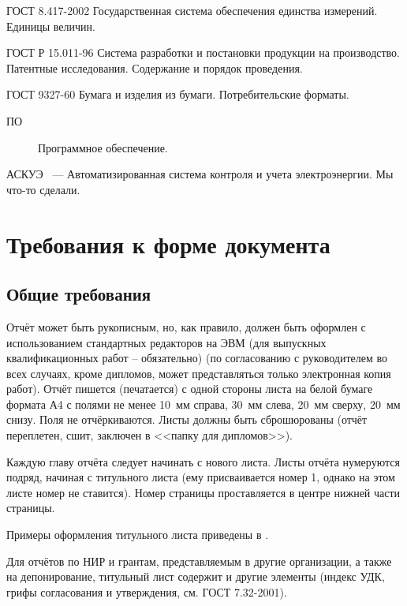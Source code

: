 \documentclass[utf8,12pt, coursreport]{G7-32}
\begin{document}
ГОСТ 8.417-2002 Государственная система обеспечения единства измерений. Единицы величин.

ГОСТ Р 15.011-96 Система разработки и постановки продукции на производство. Патентные исследования. Содержание и порядок проведения.

ГОСТ 9327-60 Бумага и изделия из бумаги. Потребительские форматы.


\Abbreviations

\begin{description}
\item[ПО] Программное обеспечение.

\end{description}


\Introduction

АСКУЭ ~--- Автоматизированная система контроля и учета электроэнергии.
Мы что-то сделали.

\mainmatter %

\chapter{Требования к форме документа}

\section{Общие требования}

Отчёт может быть рукописным, но, как правило, должен быть оформлен с использованием стандартных редакторов на ЭВМ (для выпускных квалификационных работ -- обязательно) (по согласованию с руководителем во всех случаях, кроме дипломов, может представляться только электронная копия работ). Отчёт пишется (печатается) с одной стороны листа на белой бумаге формата А4 с полями не менее 10~мм справа, 30~мм слева, 20~мм сверху, 20~мм снизу. Поля не отчёркиваются. Листы должны быть сброшюрованы (отчёт переплетен, сшит, заключен в <<папку для дипломов>>).

Каждую главу отчёта следует начинать с нового листа. Листы отчёта нумеруются подряд, начиная с титульного листа (ему присваивается номер 1, однако на этом листе номер не ставится). Номер страницы проставляется в центре нижней части страницы.

Примеры оформления титульного листа приведены в \cite{dferules}.

Для отчётов по НИР и грантам, представляемым в другие организации, а также на депонирование, титульный лист содержит и другие элементы (индекс УДК, грифы согласования и утверждения, см. ГОСТ 7.32-2001).
\end{document}
